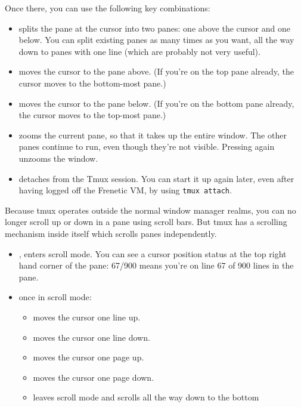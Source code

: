 Once there, you can use the following key combinations:

\begin{itemize}
\item {} \keystroke{=} splits the pane at the cursor into two panes: one above the cursor and one below.  
You can split existing panes as many times as you want, all the way down to panes with one line (which are probably
not very useful).   
\item {} \UArrow moves the cursor to the pane above.
(If you're on the top pane already, the cursor moves to the bottom-most pane.)
\item {} \DArrow moves the cursor to the pane below.
(If you're on the bottom pane already, the cursor moves to the top-most pane.)
\item {}  zooms the current pane, so that it takes up the entire window. 
The other panes continue to run, even though they're not visible.
Pressing   again unzooms the window.  
\item {}  detaches from the Tmux session.  
You can start it up again later, even after having logged off the Frenetic VM, by using 
\lstinline[style=BashInputStyle]{tmux attach}.
\end{itemize}

Because tmux operates outside the normal window manager realms, you can no longer scroll up or down
in a pane using scroll bars.  
But tmux has a scrolling mechanism inside itself which scrolls panes independently.  

\begin{itemize}
\item {}, \keystroke{[} enters scroll mode.  
You can see a cursor position status at the top right hand corner of the pane: 67/900 means you're
on line 67 of 900 lines in the pane.   
\item once in scroll mode:
\begin{itemize}
\item \UArrow moves the cursor one line up.
\item \DArrow moves the cursor one line down.
\item \PgUp moves the cursor one page up.
\item \PgDown moves the cursor one page down.
\item\Esc leaves scroll mode and scrolls all the way down to the bottom
\end{itemize}
\end{itemize}

